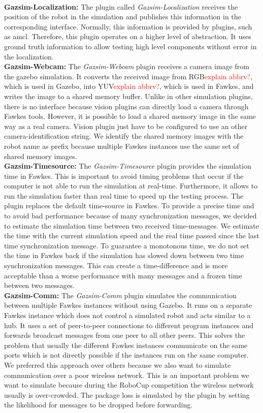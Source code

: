\\
\textbf{Gazsim-Localization:}
The plugin called \textit{Gazsim-Localization} receives the position of the robot in the simulation and publishes this information in the corresponding interface. Normally, this information is provided by plugins, such as amcl. Therefore, this plugin operates on a higher level of abstraction. It uses ground truth information to allow testing high level components without error in the localization. 
\\
\textbf{Gazsim-Webcam:}
The \textit{Gazsim-Webcam} plugin receives a camera image from the gazebo simulation. It converts the received image from RGB\textcolor{red}{explain abbrv?}, which is used in Gazebo, into YUV\textcolor{red}{explain abbrv?}, which is used in Fawkes, and writes the image to a shared memory buffer. Unlike in other simulation plugins, there is no interface because vision plugins can directly load a camera through Fawkes tools. However, it is possible to load a shared memory image in the same way as a real camera. Vision plugin just have to be configured to use an other camera-identification string. We identify the shared memory images with the robot name as prefix because multiple Fawkes instances use the same set of shared memory images. %
\\
\textbf{Gazsim-Timesource:}
The \textit{Gazsim-Timesource} plugin provides the simulation time in Fawkes. This is important to avoid timing problems that occur if the computer is not able to run the simulation at real-time. Furthermore, it allows to run the simulation faster than real time to speed up the testing process. The plugin replaces the default time-source in Fawkes. To provide a precise time and to avoid bad performance because of many synchronization messages, we decided to estimate the simulation time between two received time-messages. We estimate the time with the current simulation speed and the real time passed since the last time synchronization message. To guarantee a monotonous time, we do not set the time in Fawkes back if the simulation has slowed down between two time synchronization messages. This can create a time-difference and is more acceptable than a worse performance with many messages and a frozen time between two messages.
\\
\textbf{Gazsim-Comm:}
The \textit{Gazsim-Comm} plugin simulates the communication between multiple Fawkes instances without using Gazebo. It runs on a separate Fawkes instance which does not control a simulated robot and acts similar to a hub. It uses a set of peer-to-peer connections to different program instances and forwards broadcast messages from one peer to all other peers. This solves the problem that usually the different Fawkes instances communicate on the same ports which is not directly possible if the instances run on the same computer. We preferred this approach over others because we also want to simulate communication over a poor wireless network. This is an important problem we want to simulate because during the RoboCup competition the wireless network usually is over-crowded. The package loss is simulated by the plugin by setting the likelihood for messages to be dropped before forwarding.

